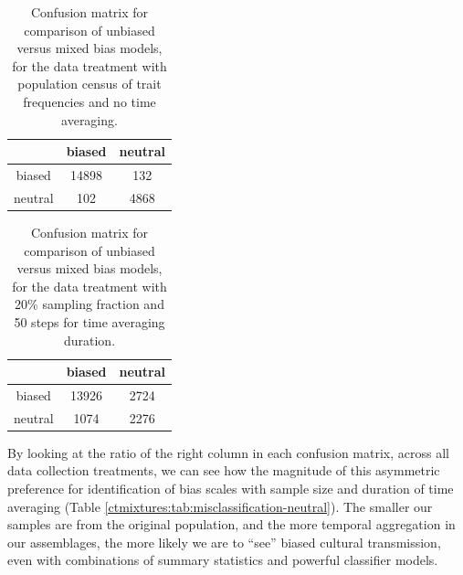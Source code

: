 \begin{table}[p!]
	
    \begin{tabular}{|c|c|c|}
      \hline
     & biased & neutral \\ 
      \hline
    biased & 14898 & 132 \\ 
      neutral & 102 & 4868 \\ 
       \hline
    \end{tabular}
    \caption{Confusion matrix for comparison of unbiased versus mixed bias models, for the data treatment with population census of trait frequencies and no time averaging.}
    \label{ctmixtures:tab:confusion-matrix-census}
\end{table}

\begin{table}[p!]

    \begin{tabular}{|c|c|c|}
      \hline
     & biased & neutral \\ 
      \hline
    biased & 13926 & 2724 \\ 
      neutral & 1074 & 2276 \\ 
       \hline
    \end{tabular}
    \caption{Confusion matrix for comparison of unbiased versus mixed bias models, for the data treatment with 20\% sampling fraction and 50 steps for time averaging duration.}
    \label{ctmixtures:tab:confusion-matrix-sampledata}
\end{table}

By looking at the ratio of the right column in each confusion matrix, across all data collection treatments, we can see how the magnitude of this asymmetric preference for identification of bias scales with sample size and duration of time averaging  (Table \ref{ctmixtures:tab:misclassification-neutral}).  The smaller our samples are from the original population, and the more temporal aggregation in our assemblages, the more likely we are to ``see'' biased cultural transmission, even with combinations of summary statistics and powerful classifier models.

